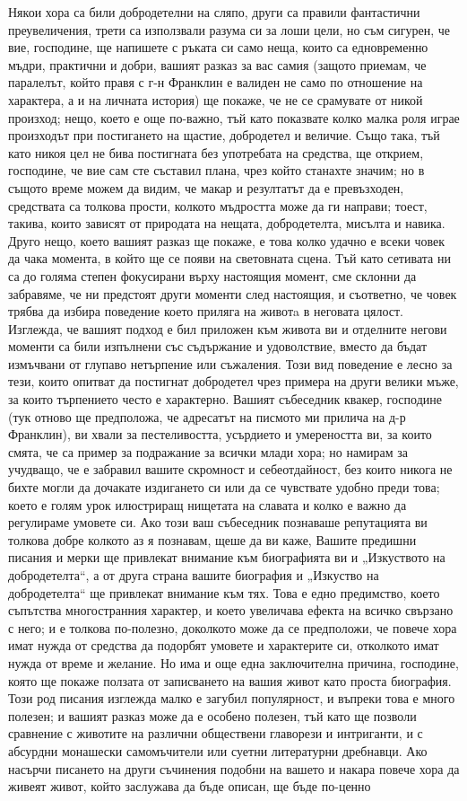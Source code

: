 \documentclass[12pt]{book}
\begin{document}
Някои хора са били добродетелни на сляпо, други са правили фантастични преувеличения, трети са използвали разума си за лоши цели, но съм сигурен, че вие, господине, ще напишете с ръката си само неща, които са едновременно мъдри, практични и добри, вашият разказ за вас самия (защото приемам, че паралелът, който правя с г-н Франклин е валиден не само по отношение на характера, а и на личната история) ще покаже, че не се срамувате от никой произход; нещо, което е още по-важно, тъй като показвате колко малка роля играе произходът при постигането на щастие, добродетел и величие. Също така, тъй като никоя цел не бива постигната без употребата на средства, ще открием, господине, че вие сам сте съставил плана, чрез който станахте значим; но в същото време можем да видим, че макар и резултатът да е превъзходен, средствата са толкова прости, колкото мъдростта може да ги направи; тоест, такива, които зависят от природата на нещата, добродетелта, мисълта и навика. Друго нещо, което вашият разказ ще покаже, е това колко удачно е всеки човек да чака момента, в който ще се появи на световната сцена. Тъй като сетивата ни са до голяма степен фокусирани върху настоящия момент, сме склонни да забравяме, че ни предстоят други моменти след настоящия, и съответно, че човек трябва да избира поведение което приляга на животa в неговата цялост. Изглежда, че вашият подход е бил приложен към живота ви и отделните негови моменти са били изпълнени със съдържание и удоволствие, вместо да бъдат измъчвани от глупаво нетърпение или съжаления. Този вид поведение е лесно за тези, които опитват да постигнат добродетел чрез примера на други велики мъже, за които търпението често е характерно. Вашият събеседник квакер, господине (тук отново ще предположа, че адресатът на писмото ми прилича на д-р Франклин), ви хвали за пестеливостта, усърдието и умереността ви, за които смята, че са пример за подражание за всички млади хора; но намирам за учудващо, че е забравил вашите скромност и себеотдайност, без които никога не бихте могли да дочакате издигането си или да се чувствате удобно преди това; което е голям урок илюстриращ нищетата на славата и колко е важно да регулираме умовете си. Ако този ваш събеседник познаваше репутацията ви толкова добре колкото аз я познавам, щеше да ви каже, Вашите предишни писания и мерки ще привлекат внимание към биографията ви и „Изкуството на добродетелта“, а от друга страна вашите биография и „Изкуство на добродетелта“ ще привлекат внимание към тях. Това е едно предимство, което съпътства многостранния характер, и което увеличава ефекта на всичко свързано с него; и е толкова по-полезно, доколкото може да се предположи, че повече хора имат нужда от средства да подорбят умовете и характерите си, отколкото имат нужда от време и желание. Но има и още една заключителна причина, господине, която ще покаже ползата от записването на вашия живот като проста биография. Този род писания изглежда малко е загубил популярност, и въпреки това е много полезен; и вашият разказ може да е особено полезен, тъй като ще позволи сравнение с животите на различни обществени главорези и интриганти, и с абсурдни монашески самомъчители или суетни литературни дребнавци. Ако насърчи писането на други съчинения подобни на вашето и накара повече хора да живеят живот, който заслужава да бъде описан, ще бъде по-ценно 
\end{document}

